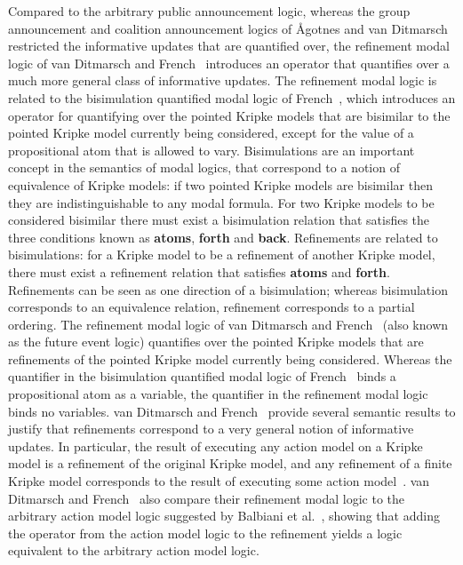 Compared to the arbitrary public announcement logic, whereas the group announcement and coalition announcement logics of {\AA}gotnes and van Ditmarsch~\cite{agotnes:2008} restricted the informative updates that are quantified over, the refinement modal logic of van Ditmarsch and French~\cite{vanditmarsch:2009} introduces an operator that quantifies over a much more general class of informative updates.
The refinement modal logic is related to the bisimulation quantified modal logic of French~\cite{french:2006}, which introduces an operator for quantifying over the pointed Kripke models that are bisimilar to the pointed Kripke model currently being considered, except for the value of a propositional atom that is allowed to vary.
Bisimulations are an important concept in the semantics of modal logics, that correspond to a notion of equivalence of Kripke models: if two pointed Kripke models are bisimilar then they are indistinguishable to any modal formula.
For two Kripke models to be considered bisimilar there must exist a bisimulation relation that satisfies the three conditions known as {\bf atoms}, {\bf forth} and {\bf back}.
Refinements are related to bisimulations: for a Kripke model to be a refinement of another Kripke model, there must exist a refinement relation that satisfies {\bf atoms} and {\bf forth}.
Refinements can be seen as one direction of a bisimulation; whereas bisimulation corresponds to an equivalence relation, refinement corresponds to a partial ordering.
The refinement modal logic of van Ditmarsch and French~\cite{vanditmarsch:2009} (also known as the future event logic) quantifies over the pointed Kripke models that are refinements of the pointed Kripke model currently being considered.
Whereas the quantifier in the bisimulation quantified modal logic of French~\cite{french:2006} binds a propositional atom as a variable, the quantifier in the refinement modal logic binds no variables.
van Ditmarsch and French~\cite{vanditmarsch:2009} provide several semantic results to justify that refinements correspond to a very general notion of informative updates.
In particular, the result of executing any action model on a Kripke model is a refinement of the original Kripke model, and any refinement of a finite Kripke model corresponds to the result of executing some action model~\cite{vanditmarsch:2009}.
van Ditmarsch and French~\cite{vanditmarsch:2009} also compare their refinement modal logic to the arbitrary action model logic suggested by Balbiani et al.~\cite{balbiani:2007}, showing that adding the operator from the action model logic to the refinement yields a logic equivalent to the arbitrary action model logic.

